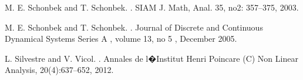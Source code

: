 \documentclass{amsart}
\numberwithin{Theorem}{section}
\theoremstyle{definition}
\theoremstyle{remark}
\begin{document}
\begin{thebibliography}{References}
 M. E. Schonbek and T. Schonbek.
.
\newblock SIAM J. Math, Anal. 35, no2: 357--375, 2003.

 M. E. Schonbek and T. Schonbek.
.
\newblock Journal of Discrete and Continuous Dynamical Systems Series A , volume 13, no 5 , December 2005.

 L. Silvestre and V. Vicol.
.
\newblock Annales de l�Institut Henri Poincare (C) Non Linear Analysis, 20(4):637--652, 2012.


\end{thebibliography}{}
\end{document}
